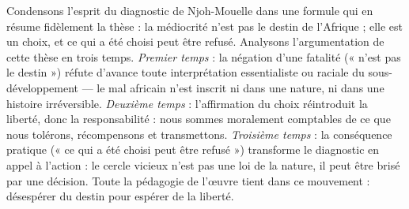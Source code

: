 \documentclass[11pt]{article}
\begin{document}
\begin{experience}
Condensons l'esprit du diagnostic de Njoh-Mouelle dans une formule qui en résume fidèlement la thèse : la médiocrité n'est pas le destin de l'Afrique ; elle est un choix, et ce qui a été choisi peut être refusé. Analysons l'argumentation de cette thèse en trois temps. \emph{Premier temps} : la négation d'une fatalité (« n'est pas le destin ») réfute d'avance toute interprétation essentialiste ou raciale du sous-développement — le mal africain n'est inscrit ni dans une nature, ni dans une histoire irréversible. \emph{Deuxième temps} : l'affirmation du choix réintroduit la liberté, donc la responsabilité : nous sommes moralement comptables de ce que nous tolérons, récompensons et transmettons. \emph{Troisième temps} : la conséquence pratique (« ce qui a été choisi peut être refusé ») transforme le diagnostic en appel à l'action : le cercle vicieux n'est pas une loi de la nature, il peut être brisé par une décision. Toute la pédagogie de l'œuvre tient dans ce mouvement : désespérer du destin pour espérer de la liberté.
\end{experience}
\end{document}
